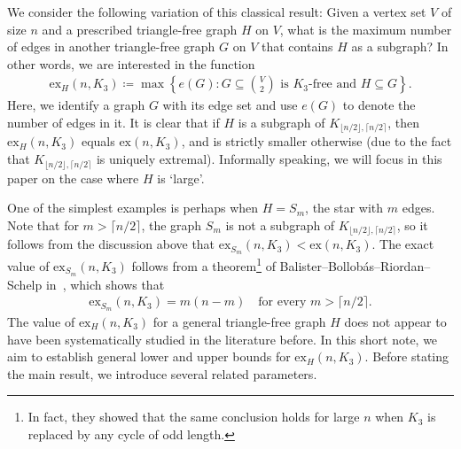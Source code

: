 \documentclass[11pt,a4paper]{article}
\newcommand{\graph}{H}
\begin{document}
We consider the following variation of this classical result: 
Given a vertex set $V$ of size $n$ and a prescribed triangle-free graph $\graph$ on $V$, what is the maximum number of edges in another triangle-free graph $G$ on $V$ that contains $\graph$ as a subgraph?
In other words, we are interested in the function 
\begin{align*}
    \mathrm{ex}_{\graph}(n,K_{3})
    \coloneqq \max\left\{e(G) \colon \text{$G \subseteq \binom{V}{2}$ is $K_{3}$-free and $\graph \subseteq G$}\right\}.
\end{align*}
%
Here, we identify a graph $G$ with its edge set and use $e(G)$ to denote the number of edges in it. 
It is clear that if $\graph$ is a subgraph of $K_{\lfloor n/2\rfloor,\lceil n/2\rceil}$, then $\mathrm{ex}_{\graph}(n,K_{3})$ equals $\mathrm{ex}(n,K_{3})$, and is strictly smaller otherwise (due to the fact that $K_{\lfloor n/2\rfloor,\lceil n/2\rceil}$ is uniquely extremal). Informally speaking, we will focus in this paper on the case where $H$ is `large'.

One of the simplest examples is perhaps when $\graph = S_{m}$, the star with $m$ edges.
Note that for $m > \lceil n/2 \rceil$, the graph $S_{m}$ is not a subgraph of $K_{\lfloor n/2\rfloor,\lceil n/2\rceil}$, so it follows from the discussion above that $\mathrm{ex}_{S_{m}}(n,K_{3}) < \mathrm{ex}(n,K_{3})$. 
The exact value of $\mathrm{ex}_{S_{m}}(n,K_{3})$ follows from a theorem\footnote{In fact, they showed that the same conclusion holds for large $n$ when $K_3$ is replaced by any cycle of odd length.} of Balister--Bollob{\'a}s--Riordan--Schelp in~\cite{BBRS03}, which shows that
\begin{align*}
    \mathrm{ex}_{S_{m}}(n,K_{3}) = m(n-m)
    \quad\text{for every $m > \lceil n/2 \rceil$.}
\end{align*}
%
The value of $\mathrm{ex}_{\graph}(n,K_{3})$ for a general triangle-free graph $\graph$ does not appear to have been systematically studied in the literature before.  
In this short note, we aim to establish general lower and upper bounds for $\mathrm{ex}_{\graph}(n,K_{3})$.
Before stating the main result, we introduce several related parameters. 
\end{document}
